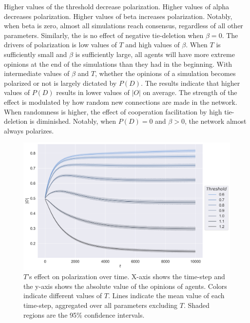 \documentclass{article}
\begin{document}
Higher values of the threshold decrease polarization. Higher values of alpha decreases polarization. Higher values of beta increases polarization. Notably, when beta is zero, almost all simulations reach consensus, regardless of all other parameters. Similarly, the is no effect of negative tie-deletion when $\beta = 0$. 
The drivers of polarization is low values of $T$ and high values of $\beta$. When $T$ is sufficiently small and $\beta$ is sufficiently large, all agents will have more extreme opinions at the end of the simulations than they had in the beginning. With intermediate values of $\beta$ and $T$, whether the opinions of a simulation becomes polarized or not is largely dictated by $P(D)$. 
The results indicate that higher values of $P(D)$ results in lower values of $|O|$ on average. 
The strength of the effect is modulated by how random new connections are made in the network. 
When randomness is higher, the effect of cooperation facilitation by high tie-deletion is diminished. 
Notably, when $P(D) = 0$ and $\beta > 0$, the network almost always polarizes. 

\begin{figure}[H]
    \centering
    \includegraphics[width=.8\linewidth]{../plots/overall/Absolute_Opinion_Threshold.png}
  \caption{$T$'s effect on polarization over time. X-axis shows the time-step and the y-axis shows the absolute value of the opinions of agents. Colors indicate different values of $T$. Lines indicate the mean value of each time-step, aggregated over all parameters excluding $T$. Shaded regions are the 95\% confidence intervals.}
  \label{fig:sfig1}
\end{figure}
\end{document}
